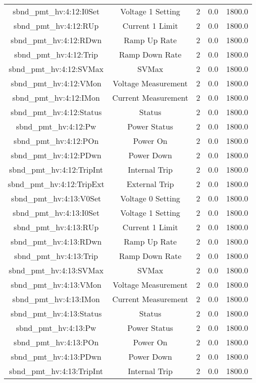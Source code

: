 \begin{table}[ptb]
\begin{tabular}{c | c c c c}
sbnd_pmt_hv:4:12:I0Set & Voltage 1 Setting & 2 & 0.0 & 1800.0\\ 
sbnd_pmt_hv:4:12:RUp & Current 1 Limit & 2 & 0.0 & 1800.0\\ 
sbnd_pmt_hv:4:12:RDwn & Ramp Up Rate & 2 & 0.0 & 1800.0\\ 
sbnd_pmt_hv:4:12:Trip & Ramp Down Rate & 2 & 0.0 & 1800.0\\ 
sbnd_pmt_hv:4:12:SVMax & SVMax & 2 & 0.0 & 1800.0\\ 
sbnd_pmt_hv:4:12:VMon & Voltage Measurement & 2 & 0.0 & 1800.0\\ 
sbnd_pmt_hv:4:12:IMon & Current Measurement & 2 & 0.0 & 1800.0\\ 
sbnd_pmt_hv:4:12:Status & Status & 2 & 0.0 & 1800.0\\ 
sbnd_pmt_hv:4:12:Pw & Power Status & 2 & 0.0 & 1800.0\\ 
sbnd_pmt_hv:4:12:POn & Power On & 2 & 0.0 & 1800.0\\ 
sbnd_pmt_hv:4:12:PDwn & Power Down & 2 & 0.0 & 1800.0\\ 
sbnd_pmt_hv:4:12:TripInt & Internal Trip & 2 & 0.0 & 1800.0\\ 
sbnd_pmt_hv:4:12:TripExt & External Trip & 2 & 0.0 & 1800.0\\ 
sbnd_pmt_hv:4:13:V0Set & Voltage 0 Setting & 2 & 0.0 & 1800.0\\ 
sbnd_pmt_hv:4:13:I0Set & Voltage 1 Setting & 2 & 0.0 & 1800.0\\ 
sbnd_pmt_hv:4:13:RUp & Current 1 Limit & 2 & 0.0 & 1800.0\\ 
sbnd_pmt_hv:4:13:RDwn & Ramp Up Rate & 2 & 0.0 & 1800.0\\ 
sbnd_pmt_hv:4:13:Trip & Ramp Down Rate & 2 & 0.0 & 1800.0\\ 
sbnd_pmt_hv:4:13:SVMax & SVMax & 2 & 0.0 & 1800.0\\ 
sbnd_pmt_hv:4:13:VMon & Voltage Measurement & 2 & 0.0 & 1800.0\\ 
sbnd_pmt_hv:4:13:IMon & Current Measurement & 2 & 0.0 & 1800.0\\ 
sbnd_pmt_hv:4:13:Status & Status & 2 & 0.0 & 1800.0\\ 
sbnd_pmt_hv:4:13:Pw & Power Status & 2 & 0.0 & 1800.0\\ 
sbnd_pmt_hv:4:13:POn & Power On & 2 & 0.0 & 1800.0\\ 
sbnd_pmt_hv:4:13:PDwn & Power Down & 2 & 0.0 & 1800.0\\ 
sbnd_pmt_hv:4:13:TripInt & Internal Trip & 2 & 0.0 & 1800.0\\ 

\end{tabular}
\end{table}

